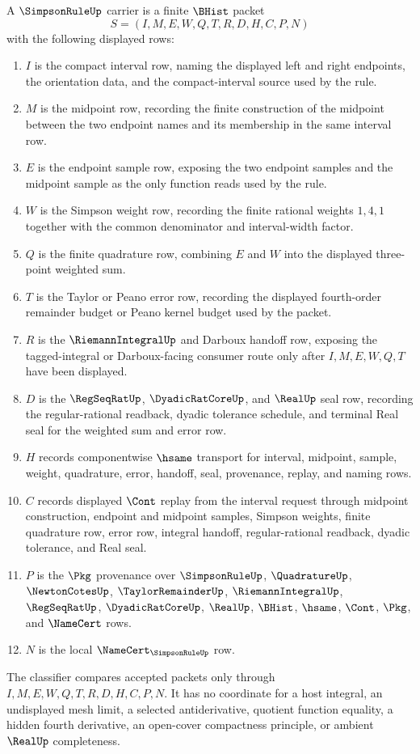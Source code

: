 \begin{definition}
\label{def:simpson-rule-carrier}
A $\SimpsonRuleUp$ carrier is a finite $\BHist$ packet
$$
S=(I,M,E,W,Q,T,R,D,H,C,P,N)
$$
with the following displayed rows:
\begin{enumerate}
\item $I$ is the compact interval row, naming the displayed left and right endpoints, the orientation data, and the compact-interval source used by the rule.
\item $M$ is the midpoint row, recording the finite construction of the midpoint between the two endpoint names and its membership in the same interval row.
\item $E$ is the endpoint sample row, exposing the two endpoint samples and the midpoint sample as the only function reads used by the rule.
\item $W$ is the Simpson weight row, recording the finite rational weights $1,4,1$ together with the common denominator and interval-width factor.
\item $Q$ is the finite quadrature row, combining $E$ and $W$ into the displayed three-point weighted sum.
\item $T$ is the Taylor or Peano error row, recording the displayed fourth-order remainder budget or Peano kernel budget used by the packet.
\item $R$ is the $\RiemannIntegralUp$ and Darboux handoff row, exposing the tagged-integral or Darboux-facing consumer route only after $I,M,E,W,Q,T$ have been displayed.
\item $D$ is the $\RegSeqRatUp$, $\DyadicRatCoreUp$, and $\RealUp$ seal row, recording the regular-rational readback, dyadic tolerance schedule, and terminal Real seal for the weighted sum and error row.
\item $H$ records componentwise $\hsame$ transport for interval, midpoint, sample, weight, quadrature, error, handoff, seal, provenance, replay, and naming rows.
\item $C$ records displayed $\Cont$ replay from the interval request through midpoint construction, endpoint and midpoint samples, Simpson weights, finite quadrature row, error row, integral handoff, regular-rational readback, dyadic tolerance, and Real seal.
\item $P$ is the $\Pkg$ provenance over $\SimpsonRuleUp$, $\QuadratureUp$, $\NewtonCotesUp$, $\TaylorRemainderUp$, $\RiemannIntegralUp$, $\RegSeqRatUp$, $\DyadicRatCoreUp$, $\RealUp$, $\BHist$, $\hsame$, $\Cont$, $\Pkg$, and $\NameCert$ rows.
\item $N$ is the local $\NameCert_{\SimpsonRuleUp}$ row.
\end{enumerate}
The classifier compares accepted packets only through $I,M,E,W,Q,T,R,D,H,C,P,N$. It has no coordinate for a host integral, an undisplayed mesh limit, a selected antiderivative, quotient function equality, a hidden fourth derivative, an open-cover compactness principle, or ambient $\RealUp$ completeness.
\end{definition}

